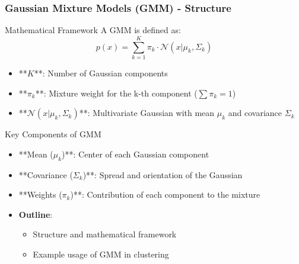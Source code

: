 \documentclass[aspectratio=169]{beamer}
\begin{document}
\begin{frame}[fragile]
    \frametitle{Gaussian Mixture Models (GMM) - Structure}
    \begin{block}{Mathematical Framework}
        A GMM is defined as:
        \begin{equation}
            p(x) = \sum_{k=1}^{K} \pi_k \cdot \mathcal{N}(x | \mu_k, \Sigma_k)
        \end{equation}
    \end{block}
   \begin{itemize}
       \item **\( K \)**: Number of Gaussian components
       \item **\( \pi_k \)**: Mixture weight for the k-th component (\( \sum \pi_k = 1 \))
       \item **\( \mathcal{N}(x | \mu_k, \Sigma_k) \)**: Multivariate Gaussian with mean \( \mu_k \) and covariance \( \Sigma_k \)
   \end{itemize}
    
    \begin{block}{Key Components of GMM}
        \begin{itemize}
            \item **Mean (\( \mu_k \))**: Center of each Gaussian component
            \item **Covariance (\( \Sigma_k \))**: Spread and orientation of the Gaussian
            \item **Weights (\( \pi_k \))**: Contribution of each component to the mixture
        \end{itemize}
    \end{block}
    
    \begin{itemize}
        \item \textbf{Outline}:
        \begin{itemize}
            \item Structure and mathematical framework
            \item Example usage of GMM in clustering
        \end{itemize}
    \end{itemize}
\end{frame}
\end{document}
